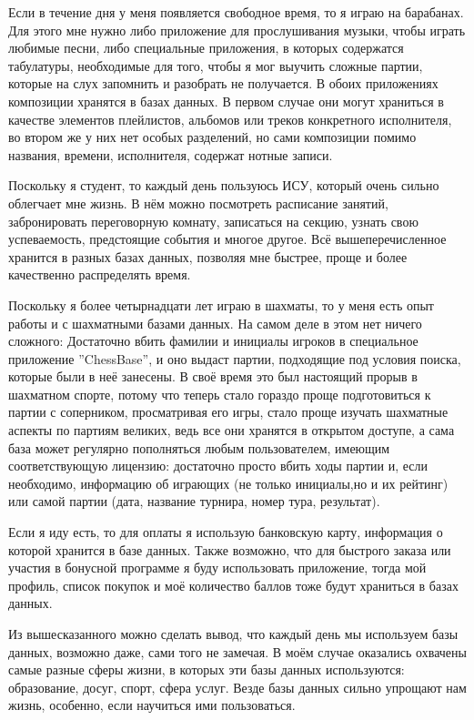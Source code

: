\documentclass[14pt]{extreport}
\begin{document}
Если в течение дня у меня появляется свободное время, то я играю на барабанах. Для этого мне нужно либо приложение для прослушивания музыки, чтобы играть любимые песни, либо специальные приложения, в которых содержатся табулатуры, необходимые для того, чтобы я мог выучить сложные партии, которые на слух запомнить и разобрать не получается. В обоих приложениях композиции хранятся в базах данных. В первом случае они могут храниться в качестве элементов плейлистов, альбомов или треков конкретного исполнителя, во втором же у них нет особых разделений, но сами композиции помимо названия, времени, исполнителя, содержат нотные записи.

Поскольку я студент, то каждый день пользуюсь ИСУ, который очень сильно облегчает мне жизнь. В нём можно посмотреть расписание занятий, забронировать переговорную комнату, записаться на секцию, узнать свою успеваемость, предстоящие события и многое другое. Всё вышеперечисленное хранится в разных базах данных, позволяя мне быстрее, проще и более качественно распределять время.

Поскольку я более четырнадцати лет играю в шахматы, то у меня есть опыт работы и с шахматными базами данных. На самом деле в этом нет ничего сложного: Достаточно вбить фамилии и инициалы игроков в специальное приложение ”ChessBase”, и оно выдаст партии, подходящие под условия поиска, которые были в неё занесены. В своё время это был настоящий прорыв в шахматном спорте, потому что теперь стало гораздо проще подготовиться к партии с соперником, просматривая его игры, стало проще изучать шахматные аспекты по партиям великих, ведь все они хранятся в открытом доступе, а сама база может регулярно пополняться любым пользователем, имеющим соответствующую лицензию: достаточно просто вбить ходы партии и, если необходимо, информацию об играющих (не только инициалы,но и их рейтинг) или самой партии (дата, название турнира, номер тура, результат).

Если я иду есть, то для оплаты я использую банковскую карту, информация о которой хранится в базе данных. Также возможно, что для быстрого заказа или участия в бонусной программе я буду использовать приложение, тогда мой профиль, список покупок и моё количество баллов тоже будут храниться в базах данных.

Из вышесказанного можно сделать вывод, что каждый день мы используем базы данных, возможно даже, сами того не замечая. В моём случае оказались охвачены самые разные сферы жизни, в которых эти базы данных используются: образование, досуг, спорт, сфера услуг. Везде базы данных сильно упрощают нам жизнь, особенно, если научиться ими пользоваться.
\end{document}

